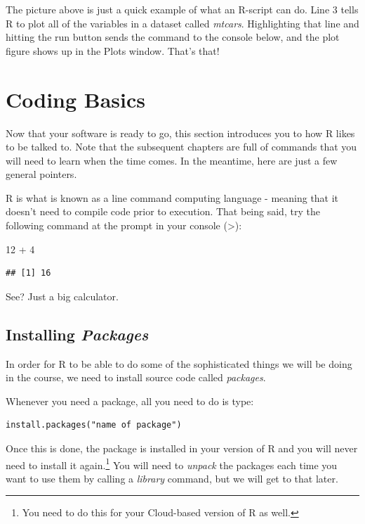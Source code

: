 \documentclass[
]{book}
\newenvironment{Shaded}{\begin{snugshade}}{\end{snugshade}}
\newcommand{\DecValTok}[1]{\textcolor[rgb]{0.00,0.00,0.81}{#1}}
\newcommand{\SpecialCharTok}[1]{\textcolor[rgb]{0.00,0.00,0.00}{#1}}
\begin{document}
The picture above is just a quick example of what an R-script can do. Line 3 tells R to plot all of the variables in a dataset called \emph{mtcars}. Highlighting that line and hitting the run button sends the command to the console below, and the plot figure shows up in the Plots window. That's that!

\hypertarget{coding-basics}{%
\section{Coding Basics}\label{coding-basics}}

Now that your software is ready to go, this section introduces you to how R likes to be talked to. Note that the subsequent chapters are full of commands that you will need to learn when the time comes. In the meantime, here are just a few general pointers.

R is what is known as a line command computing language - meaning that it doesn't need to compile code prior to execution. That being said, try the following command at the prompt in your console (\textgreater):

\begin{Shaded}
\begin{Highlighting}[]
\DecValTok{12} \SpecialCharTok{+} \DecValTok{4}
\end{Highlighting}
\end{Shaded}

\begin{verbatim}
## [1] 16
\end{verbatim}

See? Just a big calculator.

\hypertarget{installing-packages}{%
\subsection{\texorpdfstring{Installing \emph{Packages}}{Installing Packages}}\label{installing-packages}}

In order for R to be able to do some of the sophisticated things we will be doing in the course, we need to install source code called \emph{packages}.

Whenever you need a package, all you need to do is type:

\begin{verbatim}
install.packages("name of package")
\end{verbatim}

Once this is done, the package is installed in your version of R and you will never need to install it again.\footnote{You need to do this for your Cloud-based version of R as well.} You will need to \emph{unpack} the packages each time you want to use them by calling a \emph{library} command, but we will get to that later.
\end{document}
